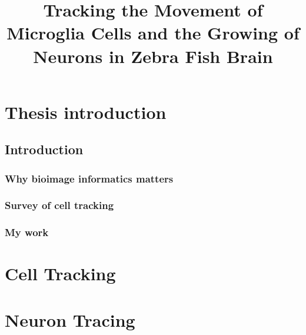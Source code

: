 \documentclass[b5,12pt]{report}
\title{Tracking the Movement of Microglia Cells and the Growing of Neurons in Zebra Fish Brain}
\begin{document}
\maketitle
\abstract
\tableofcontents
\part{Thesis introduction}
\chapter{Introduction}
\section{Why bioimage informatics matters}
\section{Survey of cell tracking}
\section{My work}
\part{Cell Tracking}
\part{Neuron Tracing}




\end{document}
